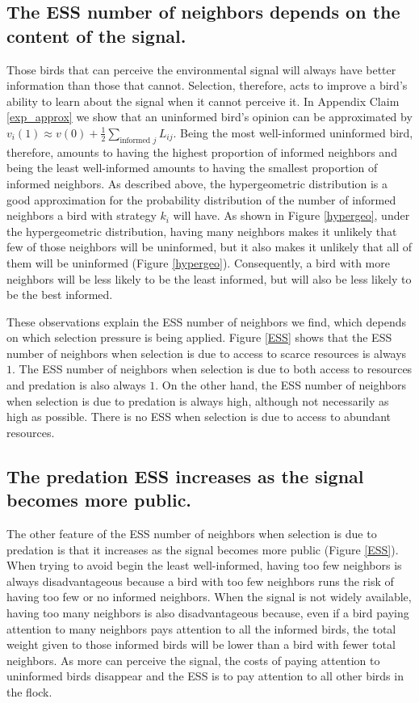 \documentclass{article}
\begin{document}
\subsection{The ESS number of neighbors depends on the content of the signal. }

Those birds that can perceive the environmental signal will always have better information than those that cannot. Selection, therefore, acts to improve a bird's ability to learn about the signal when it cannot perceive it.  In Appendix Claim \ref{exp_approx} we show that an uninformed bird's opinion can be approximated by $v_i(1)\approx v(0)+\frac{1}{2}\sum_{\text{informed }j}L_{ij}$.  Being the most well-informed uninformed bird, therefore, amounts to having the highest proportion of informed neighbors and being the least well-informed amounts to having the smallest proportion of informed neighbors. As described above, the hypergeometric distribution is a good approximation for the probability distribution of the number of informed neighbors a bird with strategy $k_i$ will have. As shown in Figure \ref{hypergeo}, under the hypergeometric distribution, having many neighbors makes it unlikely that few of those neighbors will be uninformed, but it also makes it unlikely that all of them will be uninformed (Figure \ref{hypergeo}).  Consequently, a bird with more neighbors will be less likely to be the least informed, but will also be less likely to be the best informed.

These observations explain the ESS number of neighbors we find, which depends on which selection pressure is being applied. Figure \ref{ESS} shows that the ESS number of neighbors when selection is due to access to scarce resources is always $1$. The ESS number of neighbors when selection is due to both access to resources and predation is also always $1$. On the other hand, the ESS number of neighbors when selection is due to predation is always high, although not necessarily as high as possible. There is no ESS when selection is due to access to abundant resources.

\subsection{The predation ESS increases as the signal becomes more public.}
The other feature of the ESS number of neighbors when selection is due to predation is that it increases as the signal becomes more public (Figure \ref{ESS}).  When trying to avoid begin the least well-informed, having too few neighbors is always disadvantageous because a bird with too few neighbors runs the risk of having too few or no informed neighbors.  When the signal is not widely available, having too many neighbors is also disadvantageous because, even if a bird paying attention to many neighbors pays attention to all the informed birds, the total weight given to those informed birds will be lower than a bird with fewer total neighbors. As more can perceive the signal, the costs of paying attention to uninformed birds disappear and the ESS is to pay attention to all other birds in the flock. 
\end{document}
